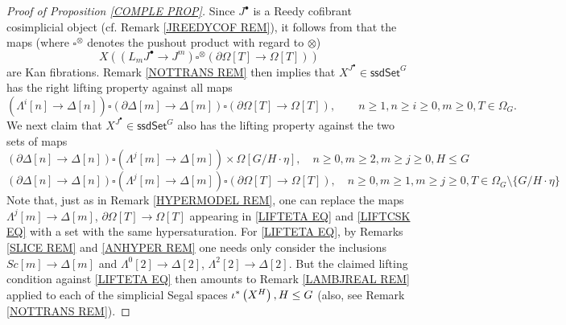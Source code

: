 \documentclass[a4paper,10pt
 ,draft
]{article}%
\begin{document}
\begin{proof}[Proof of Proposition \ref{COMPLE PROP}]
Since $J^{\bullet}$ is a Reedy cofibrant cosimplicial object (cf. Remark \ref{JREEDYCOF REM}),
it follows from \cite[Prop 7.25]{Per18} that 
the maps (where $\square^{\otimes}$ denotes the pushout product with regard to $\otimes$)
\[
X \left( \left(L_m J^{\bullet} \to J^m \right) \square^{\otimes} \left( \partial \Omega[T] \to \Omega[T] \right) \right)\]
are Kan fibrations. Remark \ref{NOTTRANS REM} then implies that
$X^{J^{\bullet}} \in \mathsf{ssdSet}^{G}$
has the right lifting property against all maps
\begin{equation}\label{LIFTBASIC EQ}
	\left( \Lambda^i[n] \to \Delta[n] \right)
\square
	\left( \partial \Delta[m] \to \Delta[m] \right)
\square
	\left( \partial \Omega[T] \to \Omega[T] \right),
	\qquad n \geq 1, n \geq i \geq 0, m\geq 0, T \in \Omega_G.
\end{equation}
We next claim that 
$X^{J^{\bullet}} \in \mathsf{ssdSet}^{G}$
also has the lifting property against the two sets of maps
\begin{equation}\label{LIFTETA EQ}
	\left( \partial \Delta[n] \to \Delta[n] \right)
\square
	\left( \Lambda^j [m] \to \Delta[m] \right)
\times
	\Omega[G/H \cdot \eta],
	\quad n \geq 0, m\geq 2, m \geq j \geq 0, H \leq G
\end{equation}
\begin{equation}\label{LIFTCSK EQ}
	\left( \partial \Delta[n] \to \Delta[n] \right)
\square
	\left( \Lambda^j [m] \to \Delta[m] \right)
\square
	\left( \partial \Omega[T] \to \Omega[T] \right),
	\quad n \geq 0, m\geq 1, m \geq j \geq 0, T \in \Omega_G \setminus \{G/H \cdot \eta\}
\end{equation}
Note that, just as in Remark \ref{HYPERMODEL REM}, one can replace the maps
$\Lambda^j[m] \to \Delta[m]$, $\partial\Omega[T] \to \Omega[T]$
appearing in \eqref{LIFTETA EQ} and  \eqref{LIFTCSK EQ}
with a set with the same hypersaturation.
For \eqref{LIFTETA EQ}, by Remarks \ref{SLICE REM} and \ref{ANHYPER REM}
one needs only consider the 
inclusions 
$Sc[m] \to \Delta[m]$ and
$\Lambda^0[2] \to \Delta[2]$,
$\Lambda^2[2] \to \Delta[2]$.
But the claimed lifting condition against \eqref{LIFTETA EQ} then amounts to 
Remark \ref{LAMBJREAL REM}
applied to each of the simplicial Segal spaces $\iota^{\**}\left(X^H\right), H\leq G$ (also, see Remark \ref{NOTTRANS REM}).



\end{proof}
\end{document}
